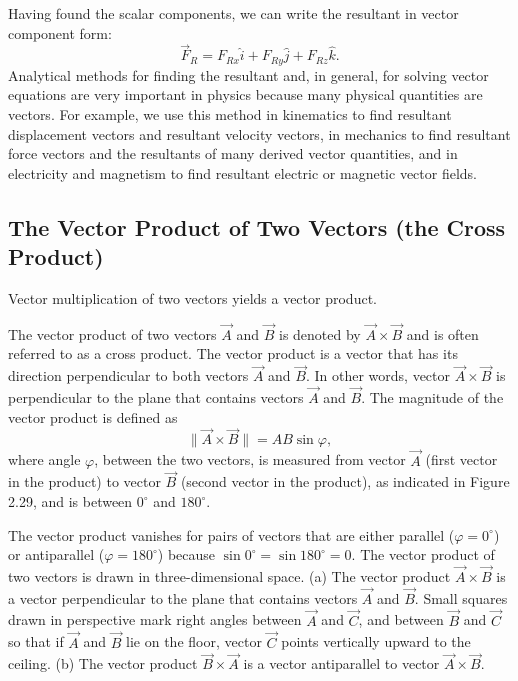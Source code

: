 \documentclass{report}
\begin{document}
        \bigbreak \noindent 
        Having found the scalar components, we can write the resultant in vector component form:
        \[
            \vec{F}_R = F_{Rx}\hat{i} + F_{Ry}\hat{j} + F_{Rz}\hat{k}.
        \]
        Analytical methods for finding the resultant and, in general, for solving vector equations are very important in physics because many physical quantities are vectors. For example, we use this method in kinematics to find resultant displacement vectors and resultant velocity vectors, in mechanics to find resultant force vectors and the resultants of many derived vector quantities, and in electricity and magnetism to find resultant electric or magnetic vector fields.

    \pagebreak 

    \bigbreak \noindent 
    \subsection{The Vector Product of Two Vectors (the Cross Product)}
    \bigbreak \noindent 
    Vector multiplication of two vectors yields a vector product.
    \bigbreak \noindent 
    \begin{thrmm}
        The vector product of two vectors $\vec{A}$ and $\vec{B}$ is denoted by $\vec{A} \times \vec{B}$ and is often referred to as a cross product. The vector product is a vector that has its direction perpendicular to both vectors $\vec{A}$ and $\vec{B}$. In other words, vector $\vec{A} \times \vec{B}$ is perpendicular to the plane that contains vectors $\vec{A}$ and $\vec{B}$. The magnitude of the vector product is defined as
        \begin{equation}
            \lVert \vec{A} \times \vec{B} \rVert = AB \sin \varphi,
        \end{equation}
        where angle $\varphi$, between the two vectors, is measured from vector $\vec{A}$ (first vector in the product) to vector $\vec{B}$ (second vector in the product), as indicated in Figure 2.29, and is between $0^\circ$ and $180^\circ$.


    \end{thrmm}
    \bigbreak \noindent 
    The vector product vanishes for pairs of vectors that are either parallel ($\varphi=0^\circ$) or antiparallel ($\varphi=180^\circ$) because $\sin 0^\circ = \sin 180^\circ = 0$.
    \bigbreak \noindent 
    \bigbreak \noindent 
    The vector product of two vectors is drawn in three-dimensional space. (a) The vector product $\vec{A} \times \vec{B}$ is a vector perpendicular to the plane that contains vectors $\vec{A}$ and $\vec{B}$. Small squares drawn in perspective mark right angles between $\vec{A}$ and $\vec{C}$, and between $\vec{B}$ and $\vec{C}$ so that if $\vec{A}$ and $\vec{B}$ lie on the floor, vector $\vec{C}$ points vertically upward to the ceiling. (b) The vector product $\vec{B} \times \vec{A}$ is a vector antiparallel to vector $\vec{A} \times \vec{B}$.
\end{document}
